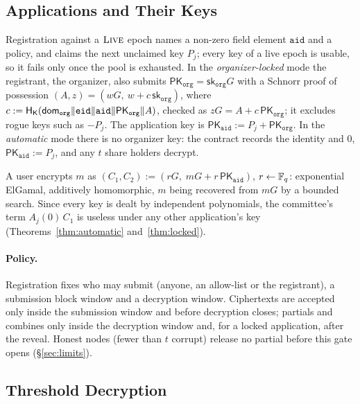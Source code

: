 \subsection{Applications and Their Keys}
\label{subsec:apps}

Registration against a $\textsc{Live}$ epoch names a non-zero field element $\mathtt{aid}$ and a policy, and claims the next unclaimed key $P_j$; every key of a live epoch is usable, so it fails only once the pool is exhausted. In the \emph{organizer-locked} mode the registrant, the organizer, also submits $\mathsf{PK}_{\mathtt{org}} = \mathsf{sk}_{\mathtt{org}} G$ with a Schnorr proof of possession $(A, z) = (wG,\ w + c\,\mathsf{sk}_{\mathtt{org}})$, where $c := \mathsf{H}_{\mathsf{K}}(\mathsf{dom}_{\mathtt{org}} \| \mathtt{eid} \| \mathtt{aid} \|\allowbreak \mathsf{PK}_{\mathtt{org}} \| A)$, checked as $zG = A + c\,\mathsf{PK}_{\mathtt{org}}$; it excludes rogue keys such as $-P_j$. The application key is $\mathsf{PK}_{\mathtt{aid}} := P_j + \mathsf{PK}_{\mathtt{org}}$. In the \emph{automatic} mode there is no organizer key: the contract records the identity and $0$, $\mathsf{PK}_{\mathtt{aid}} := P_j$, and any $t$ share holders decrypt.

A user encrypts $m$ as $(C_1, C_2) := (rG,\; mG + r\,\mathsf{PK}_{\mathtt{aid}})$, $r \leftarrow \mathbb{F}_q$: exponential ElGamal, additively homomorphic, $m$ being recovered from $mG$ by a bounded search. Since every key is dealt by independent polynomials, the committee's term $A_j(0)\,C_1$ is useless under any other application's key (Theorems~\ref{thm:automatic} and~\ref{thm:locked}).

\paragraph{Policy.} Registration fixes who may submit (anyone, an allow-list or the registrant), a submission block window and a decryption window. Ciphertexts are accepted only inside the submission window and before decryption closes; partials and combines only inside the decryption window and, for a locked application, after the reveal. Honest nodes (fewer than $t$ corrupt) release no partial before this gate opens (\S\ref{sec:limits}).

\subsection{Threshold Decryption}
\label{subsec:decryption}



